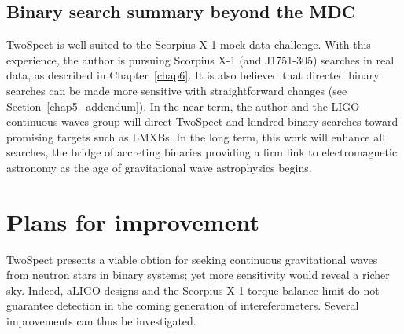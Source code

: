\subsection{Binary search summary beyond the MDC}
TwoSpect is well-suited to the Scorpius X-1 mock data challenge.
With this experience, the author is pursuing Scorpius X-1 (and J1751-305) searches in real data, as described in Chapter~\ref{chap6}.
It is also believed that directed binary searches can be made more sensitive with straightforward changes (see Section~\ref{chap5_addendum}).
In the near term, the author and the LIGO continuous waves group will direct TwoSpect and kindred binary searches toward promising targets such as LMXBs.
In the long term, this work will enhance all searches, the bridge of accreting binaries providing a firm link to electromagnetic astronomy as the age of gravitational wave astrophysics begins.



%
%





\section{Plans for improvement}
\label{plans_for_TwoSpect_improvement}

TwoSpect presents a viable obtion for seeking continuous gravitational waves from neutron stars in binary systems; yet more sensitivity would reveal a richer sky.
Indeed, aLIGO designs and the Scorpius X-1 torque-balance limit do not guarantee detection in the coming generation of intereferometers.
Several improvements can thus be investigated.

